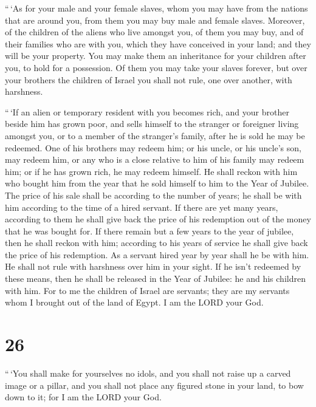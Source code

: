  ``\,`As for your male and your female slaves, whom you may
have from the nations that are around you, from them you may buy male
and female slaves.  Moreover, of the children of the aliens
who live amongst you, of them you may buy, and of their families who are
with you, which they have conceived in your land; and they will be your
property.  You may make them an inheritance for your
children after you, to hold for a possession. Of them you may take your
slaves forever, but over your brothers the children of Israel you shall
not rule, one over another, with harshness.

 ``\,`If an alien or temporary resident with you becomes
rich, and your brother beside him has grown poor, and sells himself to
the stranger or foreigner living amongst you, or to a member of the
stranger's family,  after he is sold he may be redeemed.
One of his brothers may redeem him;  or his uncle, or his
uncle's son, may redeem him, or any who is a close relative to him of
his family may redeem him; or if he has grown rich, he may redeem
himself.  He shall reckon with him who bought him from the
year that he sold himself to him to the Year of Jubilee. The price of
his sale shall be according to the number of years; he shall be with him
according to the time of a hired servant.  If there are yet
many years, according to them he shall give back the price of his
redemption out of the money that he was bought for.  If
there remain but a few years to the year of jubilee, then he shall
reckon with him; according to his years of service he shall give back
the price of his redemption.  As a servant hired year by
year shall he be with him. He shall not rule with harshness over him in
your sight.  If he isn't redeemed by these means, then he
shall be released in the Year of Jubilee: he and his children with him.
 For to me the children of Israel are servants; they are my
servants whom I brought out of the land of Egypt. I am the LORD your
God.

\hypertarget{section-25}{%
\section{26}\label{section-25}}

 ``\,`You shall make for yourselves no idols, and you shall
not raise up a carved image or a pillar, and you shall not place any
figured stone in your land, to bow down to it; for I am the LORD your
God.

